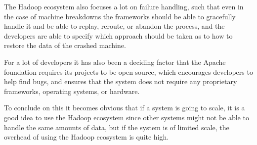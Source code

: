 \newpar The Hadoop ecosystem also focuses a lot on failure handling, such that even in the case of machine breakdowns the frameworks should be able to gracefully handle it and be able to replay, reroute, or abandon the process, and the developers are able to specify which approach should be taken as to how to restore the data of the crashed machine. 

\newpar For a lot of developers it has also been a deciding factor that the Apache foundation requires its projects to be open-source, which encourages developers to help find bugs, and ensures that the system does not require any proprietary frameworks, operating systems, or hardware.

\newpar To conclude on this it becomes obvious that if a system is going to scale, it is a good idea to use the Hadoop ecosystem since other systems might not be able to handle the same amounts of data, but if the system is of limited scale, the overhead of using the Hadoop ecosystem is quite high.

